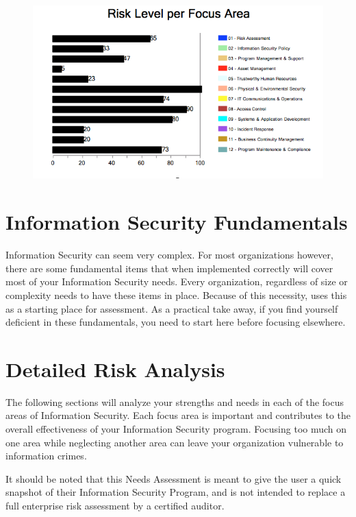 \documentclass{needs}
\begin{document}
		\begin{figure}[h]
			\includegraphics[width = 1\textwidth]{chart.png}
		\end{figure}
		
	
	\section{Information Security Fundamentals}
		Information Security can seem very complex.  For most organizations however, there are some fundamental items that when implemented correctly will cover most of your Information Security needs.  Every organization, regardless of size or complexity needs to have these items in place.  Because of this necessity, \theauthor uses this as a starting place for assessment.  As a practical take away, if you find yourself deficient in these fundamentals, you need to start here before focusing elsewhere.
	
	\infoTable
	
	\section{Detailed Risk Analysis}
		
		The following sections will analyze your strengths and needs in each of the focus areas of Information Security.  Each focus area is important and contributes to the overall effectiveness of your Information Security program.  Focusing too much on one area while neglecting another area can leave your organization vulnerable to information crimes.
		
		It should be noted that this Needs Assessment is meant to give the user a quick snapshot of their Information Security Program, and is not intended to replace a full enterprise risk assessment by a certified auditor.  
	
\end{document}
